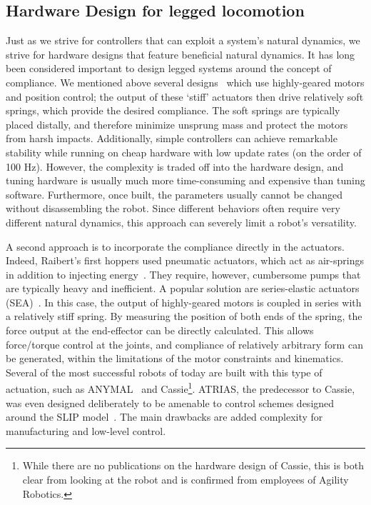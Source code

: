 \subsection{Hardware Design for legged locomotion}

Just as we strive for controllers that can exploit a system's natural dynamics, we strive for hardware designs that feature beneficial natural dynamics.
It has long been considered important to design legged systems around the concept of compliance.
We mentioned above several designs~\cite{sprowitz2013towards,buchli2006resonance,altendorfer2001rhex,owaki2013simple} which use highly-geared motors and position control; the output of these `stiff' actuators then drive relatively soft springs, which provide the desired compliance. The soft springs are typically placed distally, and therefore minimize unsprung mass and protect the motors from harsh impacts. Additionally, simple controllers can achieve remarkable stability while running on cheap hardware with low update rates (on the order of 100 Hz). However, the complexity is traded off into the hardware design, and tuning hardware is usually much more time-consuming and expensive than tuning software. Furthermore, once built, the parameters usually cannot be changed without disassembling the robot. Since different behaviors often require very different natural dynamics, this approach can severely limit a robot's versatility. \par
A second approach is to incorporate the compliance directly in the actuators. Indeed, Raibert's first hoppers used pneumatic actuators, which act as air-springs in addition to injecting energy~\cite{raibert1986legged}. They require, however, cumbersome pumps that are typically heavy and inefficient.
A popular solution are series-elastic actuators (SEA)~\cite{pratt1995series}. In this case, the output of highly-geared motors is coupled in series with a relatively stiff spring. By measuring the position of both ends of the spring, the force output at the end-effector can be directly calculated. This allows force/torque control at the joints, and compliance of relatively arbitrary form can be generated, within the limitations of the motor constraints and kinematics. Several of the most successful robots of today are built with this type of actuation, such as ANYMAL~\cite{hutter2016anymal} and Cassie\footnote{While there are no publications on the hardware design of Cassie, this is both clear from looking at the robot and is confirmed from employees of Agility Robotics.}. ATRIAS, the predecessor to Cassie, was even designed deliberately to be amenable to control schemes designed around the SLIP model~\cite{hubicki2016atrias}. The main drawbacks are added complexity for manufacturing and low-level control.
